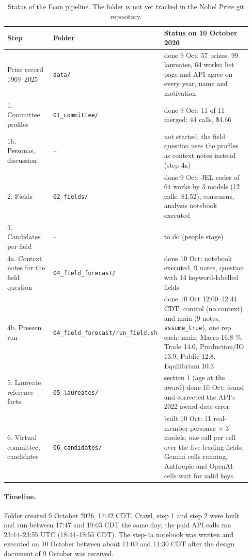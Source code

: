 \documentclass[11pt,a4paper]{article}
\newcommand{\code}[1]{\texttt{#1}}
\begin{document}
\begin{table}[h]
\small
\begin{tabularx}{\textwidth}{@{}llL@{}}
\toprule
Step & Folder & Status on 10 October 2026 \\
\midrule
Prize record 1969--2025 & \code{data/} & done 9 Oct: 57 prizes, 99 laureates, 64 works; list page and API agree on every year, name and motivation \\
1. Committee profiles & \code{01\_committee/} & done 9 Oct: 11 of 11 merged; 44 calls, \$4.66 \\
1b. Personas, discussion & -- & not started; the field question uses the profiles as context notes instead (step 4a) \\
2. Fields & \code{02\_fields/} & done 9 Oct: JEL codes of 64 works by 3 models (12 calls, \$1.52), consensus, analysis notebook executed \\
3. Candidates per field & -- & to do (people stage) \\
4a. Context notes for the field question & \code{04\_field\_forecast/} & done 10 Oct: notebook executed, 9 notes, question with 14 keyword-labelled fields \\
4b. Preseen run & \code{04\_field\_forecast/run\_field.sh} & done 10 Oct 12:00--12:44 CDT: control (no context) and main (9 notes, \code{assume\_true}), one rep each; main: Macro 16.8 \%, Trade 14.0, Production/IO 13.9, Public 12.8, Equilibrium 10.3 \\
5. Laureate reference facts & \code{05\_laureates/} & section 1 (age at the award) done 10 Oct; found and corrected the API's 2022 award-date error \\
6. Virtual committee, candidates & \code{06\_candidates/} & built 10 Oct: 11 real-member personas $\times$ 3 models, one call per cell over the five leading fields; Gemini cells running, Anthropic and OpenAI cells wait for valid keys \\
\bottomrule
\end{tabularx}
\caption{Status of the Econ pipeline. The folder is not yet tracked in the Nobel Prize git repository.}
\end{table}

\paragraph{Timeline.} Folder created 9 October 2026, 17:42 CDT. Crawl, step 1 and step 2 were built and run between
17:47 and 19:03 CDT the same day; the paid API calls ran 23:44--23:55 UTC (18:44--18:55 CDT). The step-4a notebook was
written and executed on 10 October between about 11:00 and 11:30 CDT after the design document of 9 October was
received.
\end{document}
